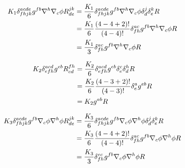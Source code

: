 \begin{align}
  K_1\delta^{acde}_{fhjk}g^{fb}\nabla^h\nabla_c\phi R^{jk}_{de}&=\frac{K_1}{6}\delta^{acde}_{fhjk}g^{fb}\nabla^h\nabla_c\phi \delta^j_d\delta^k_eR\\
  &=\frac{K_1}{6}\frac{(4-4+2)!}{(4-4)!}\delta^{ac}_{fh}g^{fb}\nabla^h\nabla_c\phi R\\
  &=\frac{K_1}{3}\delta^{ac}_{fh}g^{fb}\nabla^h\nabla_c\phi R\label{K1}
\end{align}

\begin{align}
	K_2\delta^{acd}_{efh}g^{eb}R^{fh}_{cd}&=\frac{K_2}{6}\delta^{acd}_{efh}g^{eb}\delta^c_e\delta^h_dR\\
	&=\frac{K_2}{6}\frac{(4-3+2)!}{(4-3)!}\delta^{a}_eg^{eb}R\\
	&=K_2g^{ab}R\label{K2}
\end{align}

\begin{align}
  K_3\delta^{acde}_{fhjk}g^{fb}\nabla_c\phi\nabla^h\phi R^{jk}_{de}&=\frac{K_3}{6}\delta^{acde}_{fhjk}g^{fb}\nabla_c\phi\nabla^h\phi \delta^j_d\delta^k_eR\\
  &=\frac{K_3}{6}\frac{(4-4+2)!}{(4-4)!}\delta^{ac}_{fh}g^{fb}\nabla_c\phi\nabla^h\phi R\\
  &=\frac{K_3}{3}\delta^{ec}_{fh}g^{fb}\nabla_c\phi\nabla^h\phi R\label{K3}
\end{align}

